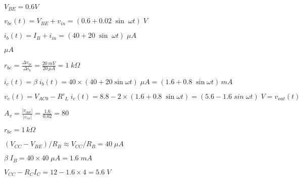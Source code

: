 \documentclass{article}
\def\lthtmlcheckvsize{\ifdim\ht\sizebox<\vsize 
  \ifdim\wd\sizebox<\hsize\expandafter\hfill\fi \expandafter\vfill
  \else\expandafter\vss\fi}%
\begin{document}
{\newpage\clearpage
{}%
$ V_{BE}=0.6V$%
\lthtmlindisplaymathZ
\lthtmlcheckvsize\clearpage}

{\newpage\clearpage
{}%
$\displaystyle v_{be}(t)=V_{BE}+v_{in}=(0.6+0.02\;\sin\;\omega t)\;V$%
\lthtmlindisplaymathZ
\lthtmlcheckvsize\clearpage}

{\newpage\clearpage
{}%
$\displaystyle i_b(t)=I_B+i_{in}=(40+20\;\sin\;\omega t)\;\mu A$%
\lthtmlindisplaymathZ
\lthtmlcheckvsize\clearpage}

{\newpage\clearpage
{}%
$ \mu A$%
\lthtmlindisplaymathZ
\lthtmlcheckvsize\clearpage}

{\newpage\clearpage
{}%
$\displaystyle r_{be}=\frac{\Delta v_{be}}{\Delta i_b} =\frac{20\,mV}{20\,\mu A}=1\;k\Omega$%
\lthtmlindisplaymathZ
\lthtmlcheckvsize\clearpage}

{\newpage\clearpage
{}%
$\displaystyle i_c(t)=\beta\; i_b(t)=40\times(40+20\sin\omega t)\;\mu A
=(1.6+ 0.8 \;\sin\omega t)\,mA$%
\lthtmlindisplaymathZ
\lthtmlcheckvsize\clearpage}

{\newpage\clearpage
{}%
$\displaystyle v_c(t)=V_{AC0}-R'_L\;i_c(t)=8.8-2\times(1.6+0.8\;\sin\omega t)
=(5.6-1.6 \;sin\;\omega t)\;V=v_{out}(t)$%
\lthtmlindisplaymathZ
\lthtmlcheckvsize\clearpage}

{\newpage\clearpage
{}%
$\displaystyle A_v=\frac{|v_{out}|}{|v_{in}|}=\frac{1.6}{0.02}=80$%
\lthtmlindisplaymathZ
\lthtmlcheckvsize\clearpage}

{\newpage\clearpage
{}%
$ r_{be}=1 \,k\Omega$%
\lthtmlindisplaymathZ
\lthtmlcheckvsize\clearpage}

{\newpage\clearpage
{}%
$\displaystyle (V_{CC}-V_{BE})/R_B \approx V_{CC}/R_B=40 \;\mu A$%
\lthtmlindisplaymathZ
\lthtmlcheckvsize\clearpage}

{\newpage\clearpage
{}%
$\displaystyle \beta\;I_B=40\times 40\;\mu A=1.6\;mA$%
\lthtmlindisplaymathZ
\lthtmlcheckvsize\clearpage}

{\newpage\clearpage
{}%
$\displaystyle V_{CC}-R_C I_C=12-1.6\times 4=5.6\;V$%
\lthtmlindisplaymathZ
\lthtmlcheckvsize\clearpage}
\end{document}
